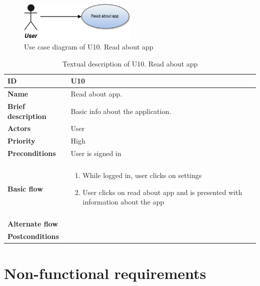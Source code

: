 \begin{figure}[htp]
	\includegraphics[width=0.5\textwidth]{fig/U10}
	\centering
	\caption{Use case diagram of U10. Read about app}
	\label{Fig:U10}
\end{figure}

\begin{table}[htp]
	\centering
	\caption{Textual description of U10. Read about app}
	\begin{tabular}[b]{|l | l|}\hline
		\textbf{ID} 				& U10									\\\hline
		\textbf{Name} 				& Read about app.						\\\hline
		\textbf{Brief description}	& Basic info about the application. 	\\\hline
		\textbf{Actors} 			& User									\\\hline
		\textbf{Priority}			& High									\\\hline
		\textbf{Preconditions}		& User is signed in						\\\hline&\\[-2ex]
		\textbf{Basic flow}			& \begin{minipage}{5in}
			\begin{enumerate}[noitemsep]
				\item While logged in, user clicks on settings
				\item User clicks on read about app and is presented with information about the app
			\end{enumerate}						
		\end{minipage}						\\\hline&\\[-2ex]
		\textbf{Alternate flow}		& \begin{minipage}{5in}
		\end{minipage}							\\\hline
		\textbf{Postconditions}		& \\\hline
	\end{tabular}
	\label{Tab:U10}
\end{table}

\pagebreak
\section{Non-functional requirements}
\label{sec:non-functional_requirements}

